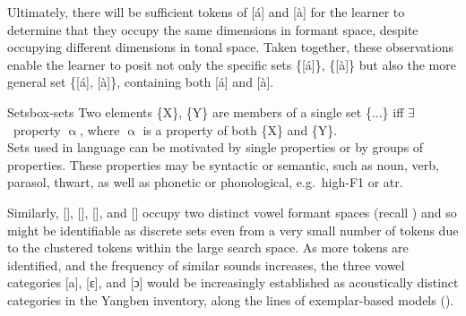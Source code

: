 Ultimately, there will be sufficient tokens of [á] and [à] for the learner to determine that they occupy the same dimensions in formant space, despite occupying different dimensions in tonal space. Taken together, these observations enable the learner to posit not only the specific sets \{[á]\}, \{[à]\} but also the more general set \{[á], [à]\},  containing  both  [á] and [à].\label{lowset}

\begin{dadpbox}{Sets}{box-sets}
Two elements \{X\},  \{Y\} are members of a single set \{...\}\down{$\upalpha$} iff $\exists$~property $\upalpha$, where $\upalpha$ is a property of both \{X\} and  \{Y\}.\\

Sets used in language can be motivated by single properties or by groups of properties. These properties may be syntactic or semantic, such as {\sc noun}, {\sc verb}, {\sc parasol}, {\sc thwart}, as well as phonetic or phonological, e.g.\ {\sc high-F1} or {\sc atr}.
\end{dadpbox}

Similarly, [], [], [], and [] occupy two distinct vowel formant spaces (recall ) and so might be identifiable as discrete sets even from a very small number of tokens due to the clustered tokens within the large search space. As more tokens are identified, and the frequency of similar sounds increases, the three vowel categories [a], [ɛ], and [ɔ] would be increasingly established as acoustically distinct categories in the Yangben  inventory, along the lines of exemplar-based models (\citealt{Lacerda:1998, Lindblom:2000, Pierrehumbert:2001ed, Bybee:2001, Bybee:2010}).

